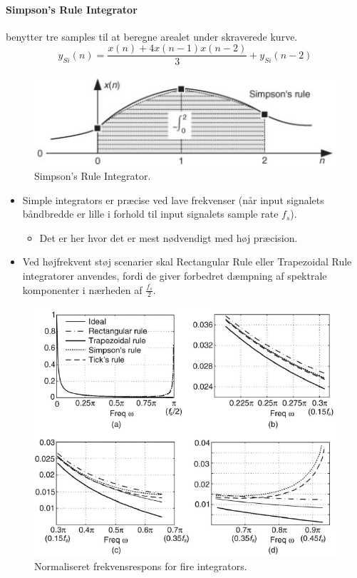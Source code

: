 \documentclass[danish]{article}
\begin{document}
\paragraph{Simpson's Rule Integrator} benytter tre samples til at beregne arealet under skraverede kurve.
\begin{equation}
y_{Si}(n) = \dfrac{x(n)+ 4x(n-1) x(n-2)}{3} + y_{Si}(n-2)
\end{equation}

\begin{figure}[H]
	\centering
	\includegraphics[width=0.6\linewidth]{graphics/simpsons_rule}
	\caption{Simpson's Rule Integrator.}
	\label{fig:simpsons_rule}
\end{figure}

\begin{itemize}
	\item Simple integrators er præcise ved lave frekvenser (når input signalets båndbredde er lille i forhold til input signalets sample rate $f_s$).
	\begin{itemize}
		\item Det er her hvor det er mest nødvendigt med høj præcision.
	\end{itemize}
	\item Ved højfrekvent støj scenarier skal Rectangular Rule eller Trapezoidal Rule integratorer anvendes, fordi de giver forbedret dæmpning af spektrale komponenter i nærheden af $\frac{f_s}{2}$.
\end{itemize}

\begin{figure}[H]
	\centering
	\includegraphics[width=0.6\linewidth]{graphics/integrators}
	\caption{Normaliseret frekvensrespons for fire integrators.}
	\label{fig:integrators}
\end{figure}
\end{document}
